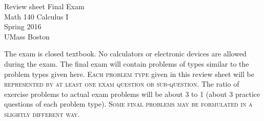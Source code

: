 \documentclass{article}
\begin{document}
\begin{center}
\Large
Review sheet Final Exam \\ Math 140 Calculus I \\ \normalsize Spring 2016 \\ UMass Boston
\end{center}


\noindent The exam is closed textbook. {\sc No calculators or electronic devices are allowed during the exam.} The final exam will contain problems of types similar to the problem types given here. \textsc{Each problem type} given in this review sheet will be \textsc{represented by at least one exam question or sub-question}. The ratio of exercise problems to actual exam problems will be about 3 to 1 (about 3 practice questions of each problem type). \textsc{Some final problems may be formulated in a slightly different way.} 
\end{document}
